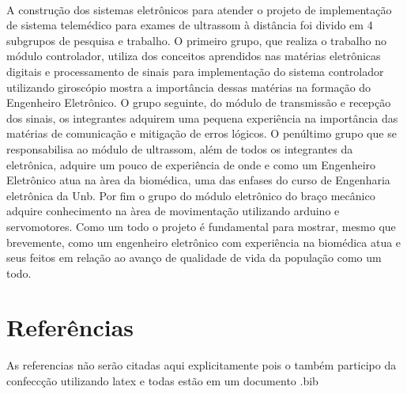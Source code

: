 \documentclass[a4paper]{article}
\begin{document}
\paragraph{} A construção dos sistemas eletrônicos para atender o projeto de implementação de sistema telemédico para exames de ultrassom à distância foi divido em 4 subgrupos de pesquisa e trabalho. O primeiro grupo, que realiza o trabalho no módulo controlador, utiliza dos conceitos aprendidos nas matérias eletrônicas digitais e  processamento de sinais para implementação do sistema controlador utilizando giroscópio mostra a importância dessas matérias na formação do Engenheiro Eletrônico. O grupo seguinte, do módulo de transmissão e recepção dos sinais, os integrantes adquirem uma pequena experiência na importância das matérias de comunicação e mitigação de erros lógicos. O penúltimo grupo que se responsabilisa ao módulo de ultrassom, além de todos os integrantes da eletrônica, adquire um pouco de experiência de onde e como um Engenheiro Eletrônico atua na àrea da biomédica, uma das enfases do curso de Engenharia eletrônica da Unb. Por fim o grupo do módulo eletrônico do braço mecânico adquire conhecimento na àrea de movimentação utilizando arduino e servomotores. Como um todo o projeto é fundamental para mostrar, mesmo que brevemente, como um engenheiro eletrônico com experiência na biomédica atua e seus feitos em relação ao avanço de qualidade de vida da população como um todo. 

\section{Referências}
As referencias não serão citadas aqui explicitamente pois o também participo da confeccção utilizando latex e todas estão em um documento .bib
\end{document}
